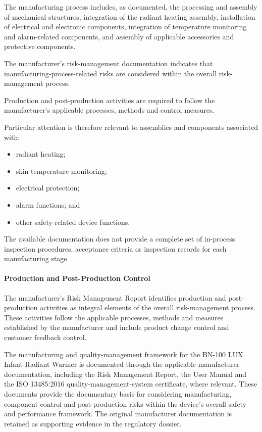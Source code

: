 The manufacturing process includes, as documented, the processing
and assembly of mechanical structures, integration of the radiant
heating assembly, installation of electrical and electronic
components, integration of temperature monitoring and alarm-related
components, and assembly of applicable accessories and protective
components.

The manufacturer's risk-management documentation indicates that
manufacturing-process-related risks are considered within the
overall risk-management process.

Production and post-production activities are required to follow the
manufacturer's applicable processes, methods and control measures.

Particular attention is therefore relevant to assemblies and
components associated with:

\begin{itemize}
    \item radiant heating;
    \item skin temperature monitoring;
    \item electrical protection;
    \item alarm functions; and
    \item other safety-related device functions.
\end{itemize}

The available documentation does not provide a complete set of
in-process inspection procedures, acceptance criteria or inspection
records for each manufacturing stage.

\paragraph{Production and Post-Production Control}

The manufacturer's Risk Management Report identifies production and post-production activities as integral elements of the overall risk-management process. These activities follow the applicable processes, methods and measures established by the manufacturer and include product change control and customer feedback control.

The manufacturing and quality-management framework for the BN-100 LUX Infant Radiant Warmer is documented through the applicable manufacturer documentation, including the Risk Management Report, the User Manual and the ISO 13485:2016 quality-management-system certificate, where relevant. These documents provide the documentary basis for considering manufacturing, component-control and post-production risks within the device's overall safety and performance framework. The original manufacturer documentation is retained as supporting evidence in the regulatory dossier.
